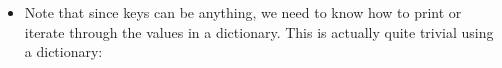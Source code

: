 \documentclass[letterpaper,10pt,english]{sphinxmanual}
\begin{document}
\begin{itemize}
\item {} 
Note that since keys can be anything, we need to know how to print or iterate through the
values in a dictionary.  This is actually quite trivial using a dictionary:

%
\begin{sphinxVerbatim}[commandchars=\\\{\}]
      
     \PYG{p}{[}\PYG{p}{]}
\end{sphinxVerbatim}

\end{itemize}
\end{document}
